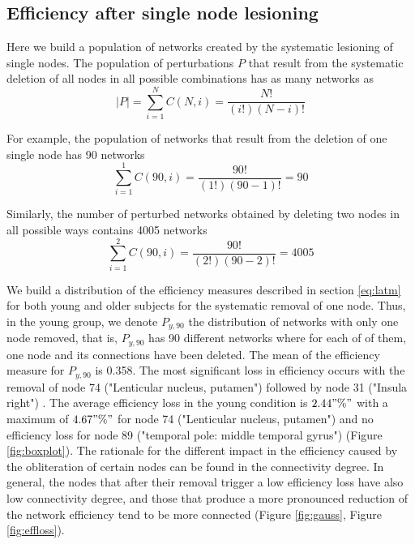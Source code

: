 \documentclass[12pt,a4paper]{article}
\begin{document}
\subsection{Efficiency after single node lesioning}
\label{ss:single}
Here we build a population of networks created by the systematic lesioning of single nodes. 
The population of perturbations $P$ that result from the systematic deletion of all nodes in all possible combinations has as many networks as  
\begin{equation*}
|P| = \sum_{i=1}^{N} C(N,i) = \frac{N!} {(i!)(N-i)!}
\label{eq:perurb}
\end{equation*}

For example, the population of networks that result from the deletion of one single node has 90 networks 
\begin{equation*}
\sum_{i=1}^{1}
C(90,i) = \frac{90!} {(1!)(90-1)!} = 90
\end{equation*}

Similarly, the number of perturbed networks obtained by deleting two nodes in all possible ways contains 4005 networks
\begin{equation*}
\sum_{i=1}^{2} C(90,i)=
 \frac{90!} {(2!)(90-2)!} = 4005
\end{equation*}

We build a distribution of the efficiency measures described in section \ref{eq:latm}
for both young and older subjects for the systematic removal of one node. Thus, in the young group, we denote $P_{y, 90}$ the distribution of networks with only one node removed, that is, $P_{y, 90}$ has 90 different networks where for each of of them, one node and its connections have been deleted. 
The mean of the efficiency measure for $P_{y, 90}$ is 0.358. 
The most significant loss in efficiency occurs with the removal of node 74 ("Lenticular nucleus, putamen") followed by node 31 ("Insula right") . 
The average efficiency loss in the young condition is $2.44"\%" $ with a maximum of  $4.67"\%" $ for node 74 ("Lenticular nucleus, putamen") and no efficiency loss for node 89 ("temporal pole: middle temporal gyrus") (Figure \ref{fig:boxplot}). The rationale for the different impact in the efficiency caused by the obliteration of certain nodes can be found in the connectivity degree. In general, the nodes that after their removal trigger a low efficiency loss have also low connectivity degree, and those that produce a more pronounced reduction of the network efficiency tend to be more connected (Figure \ref{fig:gauss}, Figure \ref{fig:effloss}). 
\end{document}

